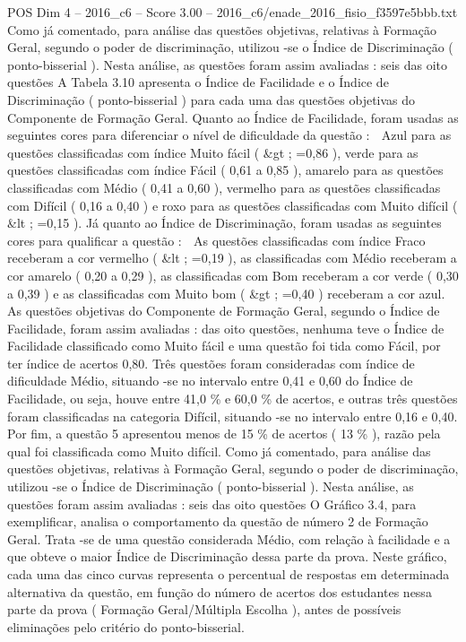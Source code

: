 \begin{textsample}{POS Dim 4 – 2016\_c6 – Score 3.00 – 2016\_c6/enade\_2016\_fisio\_f3597e5bbb.txt}
Como já comentado, para análise das questões objetivas, relativas à Formação Geral, segundo o poder de discriminação, utilizou -se o Índice de Discriminação ( ponto-bisserial ).
Nesta análise, as questões foram assim avaliadas : seis das oito questões A Tabela 3.10 apresenta o Índice de Facilidade e o Índice de Discriminação ( ponto-bisserial ) para cada uma das questões objetivas do Componente de Formação Geral.
Quanto ao Índice de Facilidade, foram usadas as seguintes cores para diferenciar o nível de dificuldade da questão :  Azul para as questões classificadas com índice Muito fácil ( \&gt ; =0,86 ), verde para as questões classificadas com índice Fácil ( 0,61 a 0,85 ), amarelo para as questões classificadas com Médio ( 0,41 a 0,60 ), vermelho para as questões classificadas com Difícil ( 0,16 a 0,40 ) e roxo para as questões classificadas com Muito difícil ( \&lt ; =0,15 ).
Já quanto ao Índice de Discriminação, foram usadas as seguintes cores para qualificar a questão :  As questões classificadas com índice Fraco receberam a cor vermelho ( \&lt ; =0,19 ), as classificadas com Médio receberam a cor amarelo ( 0,20 a 0,29 ), as classificadas com Bom receberam a cor verde ( 0,30 a 0,39 ) e as classificadas com Muito bom ( \&gt ; =0,40 ) receberam a cor azul.
As questões objetivas do Componente de Formação Geral, segundo o Índice de Facilidade, foram assim avaliadas : das oito questões, nenhuma teve o Índice de Facilidade classificado como Muito fácil e uma questão foi tida como Fácil, por ter índice de acertos 0,80.
Três questões foram consideradas com índice de dificuldade Médio, situando -se no intervalo entre 0,41 e 0,60 do Índice de Facilidade, ou seja, houve entre 41,0 \% e 60,0 \% de acertos, e outras três questões foram classificadas na categoria Difícil, situando -se no intervalo entre 0,16 e 0,40.
Por fim, a questão 5 apresentou menos de 15 \% de acertos ( 13 \% ), razão pela qual foi classificada como Muito difícil.
Como já comentado, para análise das questões objetivas, relativas à Formação Geral, segundo o poder de discriminação, utilizou -se o Índice de Discriminação ( ponto-bisserial ).
Nesta análise, as questões foram assim avaliadas : seis das oito questões O Gráfico 3.4, para exemplificar, analisa o comportamento da questão de número 2 de Formação Geral.
Trata -se de uma questão considerada Médio, com relação à facilidade e a que obteve o maior Índice de Discriminação dessa parte da prova.
Neste gráfico, cada uma das cinco curvas representa o percentual de respostas em determinada alternativa da questão, em função do número de acertos dos estudantes nessa parte da prova ( Formação Geral/Múltipla Escolha ), antes de possíveis eliminações pelo critério do ponto-bisserial.

\end{textsample}
